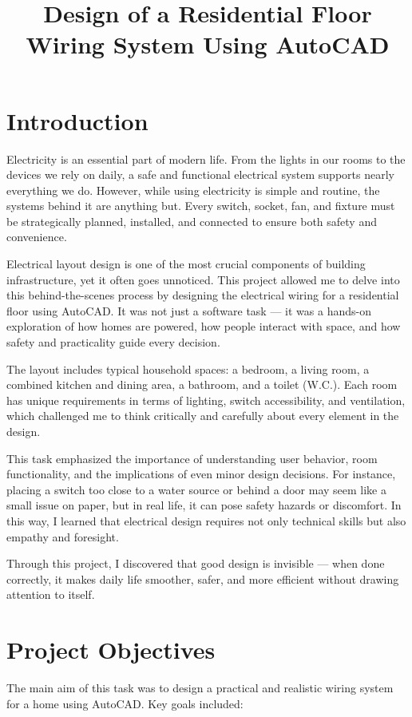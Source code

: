 \documentclass[12pt]{article}
\title{\textbf{Design of a Residential Floor Wiring System Using AutoCAD}}
\author{}
\date{}
\begin{document}
\maketitle

\section*{Introduction}
Electricity is an essential part of modern life. From the lights in our rooms to the devices we rely on daily, a safe and functional electrical system supports nearly everything we do. However, while using electricity is simple and routine, the systems behind it are anything but. Every switch, socket, fan, and fixture must be strategically planned, installed, and connected to ensure both safety and convenience.

Electrical layout design is one of the most crucial components of building infrastructure, yet it often goes unnoticed. This project allowed me to delve into this behind-the-scenes process by designing the electrical wiring for a residential floor using AutoCAD. It was not just a software task — it was a hands-on exploration of how homes are powered, how people interact with space, and how safety and practicality guide every decision.

The layout includes typical household spaces: a bedroom, a living room, a combined kitchen and dining area, a bathroom, and a toilet (W.C.). Each room has unique requirements in terms of lighting, switch accessibility, and ventilation, which challenged me to think critically and carefully about every element in the design. 

This task emphasized the importance of understanding user behavior, room functionality, and the implications of even minor design decisions. For instance, placing a switch too close to a water source or behind a door may seem like a small issue on paper, but in real life, it can pose safety hazards or discomfort. In this way, I learned that electrical design requires not only technical skills but also empathy and foresight.

Through this project, I discovered that good design is invisible — when done correctly, it makes daily life smoother, safer, and more efficient without drawing attention to itself.

\newpage

\section*{Project Objectives}
The main aim of this task was to design a practical and realistic wiring system for a home using AutoCAD. Key goals included:
\end{document}
